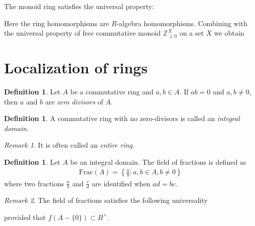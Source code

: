 \documentclass[12pt]{report}
\theoremstyle{plain}
\theoremstyle{remark}
\newtheorem*{remark}{Remark}
\theoremstyle{definition}
\newtheorem{definition}[theorem]{Definition}
\newcommand{\Z}{\mathbb{Z}}
\begin{document}
The monoid ring satisfies the universal property:
\begin{figure}[H]
    \centering
\end{figure}
\noindent
Here the ring homomorphisms are $R$-algebra homomorphisms. Combining with the universal property of free commutative monoid $\Z_{\ge 0}^X$ on a set $X$ we obtain
\begin{figure}[H]
    \centering
\end{figure}


\section{Localization of rings}
\begin{definition}
    Let $A$ be a commutative ring and $a,b\in A$. If $ab=0$ and $a,b\neq 0$, then $a$ and $b$ are \emph{zero divisors} of $A$.
\end{definition}

\begin{definition}
    A commutative ring with no zero-divisors is called an \emph{integral domain}.
\end{definition}
\begin{remark}
    It is often called an \emph{entire ring}.
\end{remark}

\begin{definition}
    Let $A$ be an integral domain. The field of fractions is defined as
    \begin{align*}
        \mathrm{Frac}(A)=\left\{\frac{a}{b}:a,b\in A,b\neq 0\right\}
    \end{align*}
    where two fractions $\frac{a}{b}$ and $\frac{c}{d}$ are identified when $ad=bc$.
\end{definition}
\begin{remark}
    The field of fractions satisfies the following universality
    \begin{figure}[H]
        \centering
    \end{figure}
    \noindent
    provided that $f(A-\{0\})\subset B^\times$.
\end{remark}
\end{document}
